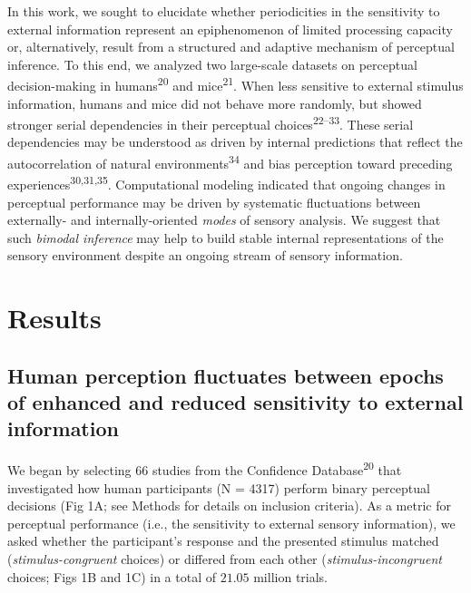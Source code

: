 \documentclass[
]{article}
\begin{document}
In this work, we sought to elucidate whether periodicities in the
sensitivity to external information represent an epiphenomenon of
limited processing capacity or, alternatively, result from a structured
and adaptive mechanism of perceptual inference. To this end, we analyzed
two large-scale datasets on perceptual decision-making in
humans\textsuperscript{20} and mice\textsuperscript{21}. When less
sensitive to external stimulus information, humans and mice did not
behave more randomly, but showed stronger serial dependencies in their
perceptual choices\textsuperscript{22--33}. These serial dependencies
may be understood as driven by internal predictions that reflect the
autocorrelation of natural environments\textsuperscript{34} and bias
perception toward preceding experiences\textsuperscript{30,31,35}.
Computational modeling indicated that ongoing changes in perceptual
performance may be driven by systematic fluctuations between externally-
and internally-oriented \emph{modes} of sensory analysis. We suggest
that such \emph{bimodal inference} may help to build stable internal
representations of the sensory environment despite an ongoing stream of
sensory information.

\hypertarget{results}{%
\section{Results}\label{results}}

\hypertarget{human-perception-fluctuates-between-epochs-of-enhanced-and-reduced-sensitivity-to-external-information}{%
\subsection{Human perception fluctuates between epochs of enhanced and
reduced sensitivity to external
information}\label{human-perception-fluctuates-between-epochs-of-enhanced-and-reduced-sensitivity-to-external-information}}

We began by selecting 66 studies from the Confidence
Database\textsuperscript{20} that investigated how human participants (N
= 4317) perform binary perceptual decisions (Fig 1A; see Methods for
details on inclusion criteria). As a metric for perceptual performance
(i.e., the sensitivity to external sensory information), we asked
whether the participant's response and the presented stimulus matched
(\emph{stimulus-congruent} choices) or differed from each other
(\emph{stimulus-incongruent} choices; Figs 1B and 1C) in a total of
\(21.05\) million trials.
\end{document}
